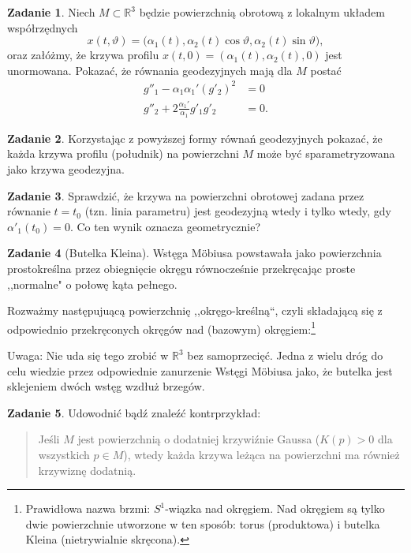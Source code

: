 \documentclass[a4paper,11pt]{article}
\theoremstyle{definition}\newtheorem{exercise}{Zadanie}
\theoremstyle{definition}\newtheorem{remark}{Uwaga}
\begin{document}
\begin{exercise}
Niech $M\subset \mathbb{R}^3$ będzie powierzchnią obrotową z lokalnym układem 
współrzędnych 
\[x(t,\vartheta)=\big(\alpha_1(t),\alpha_2(t)\cos \vartheta ,
\alpha_2(t)\sin\vartheta \big),\]
oraz załóżmy, że krzywa profilu $x(t,0)=(\alpha_1(t),\alpha_2(t),0)$ jest 
unormowana. Pokazać, że r\'ownania geodezyjnych mają dla $M$ postać
\begin{align*}
g''_1-\alpha_1\alpha_1'(g'_2)^2&=0\\
g''_2+2\frac{\alpha_1'}{\alpha_1}g'_1g'_2&=0.
\end{align*}
\end{exercise}

\begin{exercise}
Korzystając z powyższej formy r\'ownań geodezyjnych pokazać, że każda krzywa 
profilu (południk) na powierzchni $M$ może być sparametryzowana jako krzywa 
geodezyjna.
\end{exercise}

\begin{exercise}
Sprawdzić, że krzywa na powierzchni obrotowej zadana przez r\'ownanie 
$t=t_0$ (tzn. linia parametru) jest geodezyjną wtedy i tylko wtedy, gdy 
$\alpha'_1(t_0)=0$. Co ten wynik oznacza geometrycznie?

\end{exercise}




\begin{exercise}[Butelka Kleina]
Wstęga M\"obiusa powstawała jako powierzchnia prostokreślna przez obiegnięcie 
okręgu r\'ownocześnie przekręcając proste ,,normalne" o połowę kąta pełnego.

Rozważmy następujuącą powierzchnię ,,okręgo-kreślną``, czyli składającą się z 
odpowiednio przekręconych okręgów nad (bazowym) okręgiem:\footnote{
Prawidłowa nazwa brzmi: $S^1$-wiązka nad okręgiem. Nad okręgiem są 
tylko dwie powierzchnie utworzone w ten spos\'ob: torus (produktowa) i 
butelka Kleina (nietrywialnie skręcona).}





\small {Uwaga: Nie uda się tego zrobić w $\mathbb{R}^3$ bez samoprzecięć. 
Jedna z wielu dróg do celu wiedzie przez odpowiednie zanurzenie Wstęgi 
M\"{o}biusa jako, że butelka jest sklejeniem dwóch wstęg wzdłuż brzegów.}
\end{exercise}

\begin{exercise}
Udowodnić bądź znaleźć kontrprzykład:
\begin{quote}
Jeśli $M$ jest powierzchnią o dodatniej krzywiźnie Gaussa ($K(p)>0$ dla 
wszystkich $p\in M$), wtedy każda krzywa leżąca na powierzchni ma również 
krzywiznę dodatnią.
\end{quote}

\end{exercise}
\end{document}
